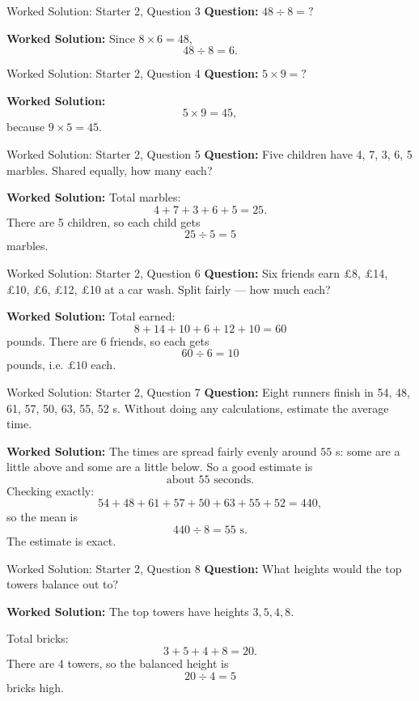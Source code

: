 \documentclass{beamer}
\begin{document}
\begin{frame}{Worked Solution: Starter 2, Question 3}
\textbf{Question:} \(48 \div 8 = ?\)

\textbf{Worked Solution:}
Since \(8 \times 6 = 48\),
\[
48 \div 8 = 6.
\]
\end{frame}

\begin{frame}{Worked Solution: Starter 2, Question 4}
\textbf{Question:} \(5 \times 9 = ?\)

\textbf{Worked Solution:}
\[
5 \times 9 = 45,
\]
because \(9 \times 5 = 45\).
\end{frame}

\begin{frame}{Worked Solution: Starter 2, Question 5}
\textbf{Question:} Five children have 4, 7, 3, 6, 5 marbles. Shared equally, how many each?

\textbf{Worked Solution:}
Total marbles:
\[
4 + 7 + 3 + 6 + 5 = 25.
\]
There are 5 children, so each child gets
\[
25 \div 5 = 5
\]
marbles.
\end{frame}

\begin{frame}{Worked Solution: Starter 2, Question 6}
\textbf{Question:} Six friends earn \pounds8, \pounds14, \pounds10, \pounds6, \pounds12, \pounds10 at a car wash. Split fairly — how much each?

\textbf{Worked Solution:}
Total earned:
\[
8 + 14 + 10 + 6 + 12 + 10 = 60
\]
pounds.
There are 6 friends, so each gets
\[
60 \div 6 = 10
\]
pounds, i.e. \(\pounds10\) each.
\end{frame}

\begin{frame}{Worked Solution: Starter 2, Question 7}
\textbf{Question:} Eight runners finish in 54, 48, 61, 57, 50, 63, 55, 52 s. Without doing any calculations, estimate the average time.

\textbf{Worked Solution:}
The times are spread fairly evenly around \(55\) s: some are a little above and some are a little below. So a good estimate is
\[
\text{about } 55 \text{ seconds}.
\]
Checking exactly:
\[
54+48+61+57+50+63+55+52=440,
\]
so the mean is
\[
440 \div 8 = 55 \text{ s}.
\]
The estimate is exact.
\end{frame}

\begin{frame}{Worked Solution: Starter 2, Question 8}
\textbf{Question:} What heights would the top towers balance out to?

\textbf{Worked Solution:}
The top towers have heights \(3, 5, 4, 8\).

Total bricks:
\[
3 + 5 + 4 + 8 = 20.
\]
There are 4 towers, so the balanced height is
\[
20 \div 4 = 5
\]
bricks high.
\end{frame}
\end{document}
